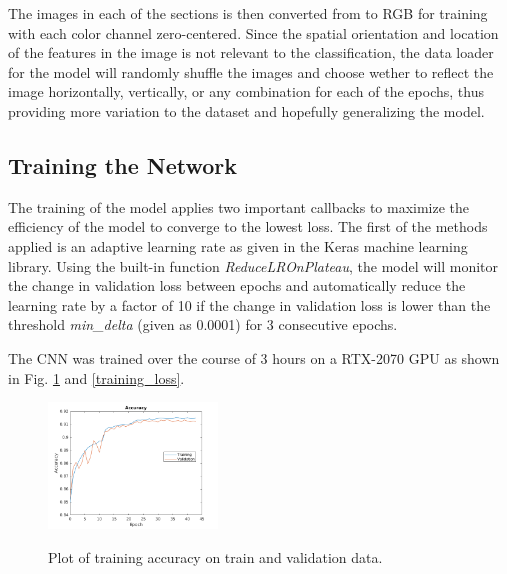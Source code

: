 \documentclass[conference]{IEEEtran}
\begin{document}
The images in each of the sections is then converted from to RGB for training with each color channel zero-centered. Since the spatial orientation and location of the features in the image is not relevant to the classification, the data loader for the model will randomly shuffle the images and choose wether to reflect the image horizontally, vertically, or any combination for each of the epochs, thus providing more variation to the dataset and hopefully generalizing the model.

\subsection{Training the Network}
 The training of the model applies two important callbacks to maximize the efficiency of the model to converge to the lowest loss. The first of the methods applied is an adaptive learning rate as given in the Keras machine learning library. Using the built-in function \emph{ReduceLROnPlateau}, the model will monitor the change in validation loss between epochs and automatically reduce the learning rate by a factor of 10 if the change in validation loss is lower than the threshold \emph{min\_delta} (given as 0.0001) for 3 consecutive epochs.

The CNN was trained over the course of 3 hours on a RTX-2070 GPU as shown in Fig. \ref{training_accuracy} and \ref{training_loss}.


%
%

\begin{figure}
\centering
\includegraphics[width=0.4\textwidth]{figures/training_accuracy.png}
\label{training_accuracy}
\caption{Plot of training accuracy on train and validation data.}
\end{figure}
\end{document}
